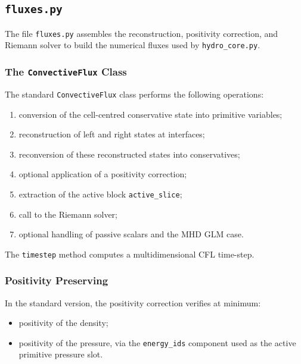 \documentclass[a4paper, 11pt]{article}
\begin{document}
\subsection{\texttt{fluxes.py}}
The file \texttt{fluxes.py} assembles the reconstruction, positivity correction, and Riemann solver to build the numerical fluxes used by \texttt{hydro\_core.py}.

\subsubsection*{The \texttt{ConvectiveFlux} Class}
The standard \texttt{ConvectiveFlux} class performs the following operations:
\begin{enumerate}
    \item conversion of the cell-centred conservative state into primitive variables;
    \item reconstruction of left and right states at interfaces;
    \item reconversion of these reconstructed states into conservatives;
    \item optional application of a positivity correction;
    \item extraction of the active block \texttt{active\_slice};
    \item call to the Riemann solver;
    \item optional handling of passive scalars and the MHD GLM case.
\end{enumerate}

The \texttt{timestep} method computes a multidimensional CFL time-step.

\subsubsection*{Positivity Preserving}
In the standard version, the positivity correction verifies at minimum:
\begin{itemize}
    \item positivity of the density;
    \item positivity of the pressure, via the \texttt{energy\_ids} component used as the active primitive pressure slot.
\end{itemize}
\end{document}
